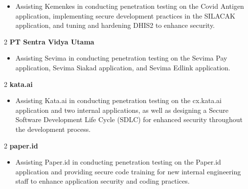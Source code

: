 \documentclass[10pt, letterpaper]{article}
\newenvironment{highlights}{
    \begin{itemize}[
        topsep=0.10 cm,
        parsep=0.10 cm,
        partopsep=0pt,
        itemsep=0pt,
        leftmargin=0 cm + 10pt
    ]
}{
    \end{itemize}
} %
\newenvironment{twocolentry}[2][]{
    \onecolentry
    \def\secondColumn{#2}
    \setcolumnwidth{\fill, 4.5 cm}
    \begin{paracol}{2}
}{
    \switchcolumn \raggedleft \secondColumn
    \end{paracol}
    \endonecolentry
} %
\begin{document}
\begin{samepage}
			\begin{justify}
				\begin{highlights}
					\item Assisting Kemenkes in conducting penetration testing on the Covid Antigen application, implementing secure development practices in the SILACAK application, and tuning and hardening DHIS2 to enhance security.
				\end{highlights}
			\end{justify}
			
			
			
			
			\begin{twocolentry}{}{\textbf{PT Sentra Vidya Utama}}
			\end{twocolentry}
			\begin{justify}
				\begin{highlights}
					\item Assisting Sevima in conducting penetration testing on the Sevima Pay application, Sevima Siakad application, and Sevima Edlink application.
				\end{highlights}
			\end{justify}
			
			
			
			
			
			\begin{twocolentry}{}{\textbf{kata.ai}}
			\end{twocolentry}
			
			\begin{justify}
				\begin{highlights}
					\item Assisting Kata.ai in conducting penetration testing on the cx.kata.ai application and two internal applications, as well as designing a Secure Software Development Life Cycle (SDLC) for enhanced security throughout the development process.
				\end{highlights}
			\end{justify}
			
			
			
			
			
			
			\begin{twocolentry}{}{\textbf{paper.id}}
			\end{twocolentry}
			
			\begin{justify}
				\begin{highlights}
					\item Assisting Paper.id in conducting penetration testing on the Paper.id application and providing secure code training for new internal engineering staff to enhance application security and coding practices.
				\end{highlights}
			\end{justify}
			

\end{samepage}
\end{document}
